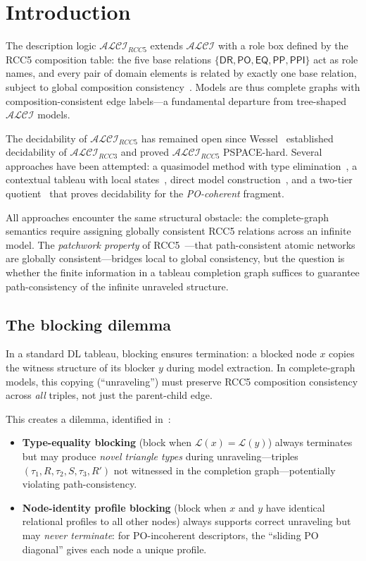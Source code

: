 \documentclass[a4paper,11pt]{article}
\theoremstyle{definition}
\newcommand{\ALCI}{\ensuremath{\mathcal{ALCI}}}
\newcommand{\ALCIRCC}[1]{\ensuremath{\mathcal{ALCI}_{\mathit{RCC#1}}}}
\newcommand{\DR}{\ensuremath{\mathsf{DR}}}
\newcommand{\PO}{\ensuremath{\mathsf{PO}}}
\newcommand{\EQ}{\ensuremath{\mathsf{EQ}}}
\newcommand{\PP}{\ensuremath{\mathsf{PP}}}
\newcommand{\PPI}{\ensuremath{\mathsf{PPI}}}
\newcommand{\LL}{\ensuremath{\mathcal{L}}}
\begin{document}
\section{Introduction}\label{sec:intro}

The description logic $\ALCIRCC{5}$ extends $\ALCI$ with a
role box defined by the RCC5 composition table: the five base
relations $\{\DR, \PO, \EQ, \PP, \PPI\}$ act as role names,
and every pair of domain elements is related by exactly one
base relation, subject to global composition
consistency~\cite{Wessel2002}.  Models are thus complete
graphs with composition-consistent edge labels---a fundamental
departure from tree-shaped $\ALCI$ models.

The decidability of $\ALCIRCC{5}$ has remained open since
Wessel~\cite{Wessel2002} established decidability of
$\ALCI_{\mathit{RCC3}}$ and proved $\ALCIRCC{5}$ PSPACE-hard.
Several approaches have been attempted: a quasimodel method
with type elimination~\cite{CompanionPaper}, a contextual
tableau with local states~\cite{GPTTableau}, direct model
construction~\cite{ClosingGap}, and a two-tier
quotient~\cite{TwoTier} that proves decidability for the
\emph{PO-coherent} fragment.

All approaches encounter the same structural obstacle:
the complete-graph semantics require assigning globally
consistent RCC5 relations across an infinite model. The
\emph{patchwork property} of RCC5~\cite{RenzNebel1999}---that
path-consistent atomic networks are globally consistent---bridges
local to global consistency, but the question is whether the
finite information in a tableau completion graph suffices to
guarantee path-consistency of the infinite unraveled structure.

\subsection*{The blocking dilemma}

In a standard DL tableau, blocking ensures termination:
a blocked node $x$ copies the witness structure of its blocker
$y$ during model extraction.  In complete-graph models, this
copying (``unraveling'') must preserve RCC5 composition
consistency across \emph{all} triples, not just the
parent-child edge.

This creates a dilemma, identified in~\cite{TwoTier}:
\begin{itemize}[nosep]
  \item \textbf{Type-equality blocking} (block when
    $\LL(x) = \LL(y)$) always terminates but may produce
    \emph{novel triangle types} during unraveling---triples
    $(\tau_1, R, \tau_2, S, \tau_3, R')$ not witnessed in
    the completion graph---potentially violating
    path-consistency.
  \item \textbf{Node-identity profile blocking} (block when
    $x$ and $y$ have identical relational profiles to all
    other nodes) always supports correct unraveling but may
    \emph{never terminate}: for PO-incoherent descriptors,
    the ``sliding PO diagonal'' gives each node a unique
    profile.
\end{itemize}
\end{document}
